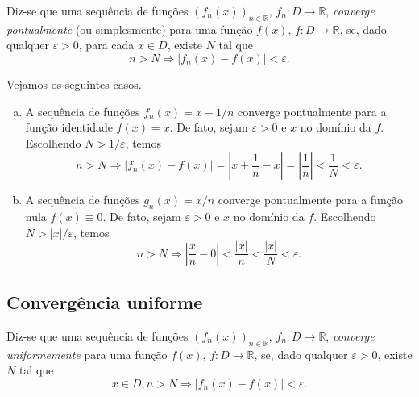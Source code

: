 \begin{defn}
  Diz-se que uma sequência de funções $(f_n(x))_{n\in\mathbb{R}}$, $f_n:D\to\mathbb{R}$, \emph{converge pontualmente} (ou simplesmente) para uma função $f(x)$, $f:D\to\mathbb{R}$, se, dado qualquer $\varepsilon>0$, para cada $x\in D$, existe $N$ tal que
  \begin{equation}
    n>N \Rightarrow |f_n(x)-f(x)|<\varepsilon.
  \end{equation}
\end{defn}

\begin{ex}\label{ex:convergencia_pontual}
  Vejamos os seguintes casos.
  \begin{enumerate}[a)]
  \item A sequência de funções $f_n(x) = x + 1/n$ converge pontualmente para a função identidade $f(x)=x$. De fato, sejam $\varepsilon>0$ e $x$ no domínio da $f$. Escolhendo $N > 1/\varepsilon$, temos
    \begin{equation}
      n>N \Rightarrow |f_n(x) - f(x)| = \left|x+\frac{1}{n} - x\right| = \left|\frac{1}{n}\right| < \frac{1}{N} < \varepsilon.
    \end{equation}
  \item A sequência de funções $g_n(x) = x/n$ converge pontualmente para a função nula $f(x) \equiv 0$. De fato, sejam $\varepsilon>0$ e $x$ no domínio da $f$. Escolhendo $N > |x|/\varepsilon$, temos
    \begin{equation}
      n>N \Rightarrow \left|\frac{x}{n} - 0\right| < \frac{|x|}{n} < \frac{|x|}{N} < \varepsilon.
    \end{equation}
  \end{enumerate}
\end{ex}

\subsection{Convergência uniforme}

\begin{defn}
  Diz-se que uma sequência de funções $(f_n(x))_{n\in\mathbb{R}}$, $f_n:D\to\mathbb{R}$, \emph{converge uniformemente} para uma função $f(x)$, $f:D\to\mathbb{R}$, se, dado qualquer $\varepsilon>0$, existe $N$ tal que
  \begin{equation}
    x\in D, n>N \Rightarrow |f_n(x)-f(x)|<\varepsilon.
  \end{equation}
\end{defn}

